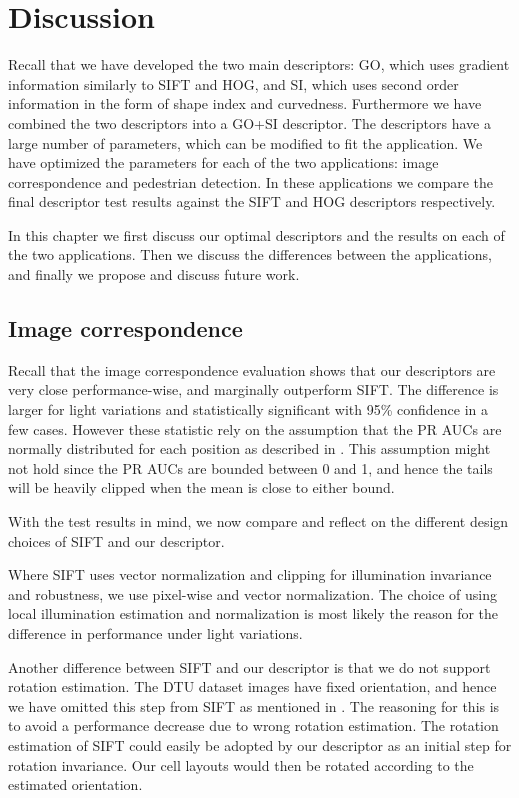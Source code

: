 \documentclass[thesis.tex]{subfiles}
\begin{document}
\chapter{Discussion}

Recall that we have developed the two main descriptors: GO, which uses gradient information similarly to SIFT and HOG, and SI, which uses second order information in the form of shape index and curvedness. Furthermore we have combined the two descriptors into a GO+SI descriptor. The descriptors have a large number of parameters, which can be modified to fit the application. We have optimized the parameters for each of the two applications: image correspondence and pedestrian detection. In these applications we compare the final descriptor test results against the SIFT and HOG descriptors respectively.

In this chapter we first discuss our optimal descriptors and the results on each of the two applications. Then we discuss the differences between the applications, and finally we propose and discuss future work.

\section{Image correspondence}
\label{sec:discussionIc}
Recall that the image correspondence evaluation shows that our descriptors are very close performance-wise, and marginally outperform SIFT. The difference is larger for light variations and statistically significant with 95\% confidence in a few cases. However these statistic rely on the assumption that the PR AUCs are normally distributed for each position as described in . This assumption might not hold since the PR AUCs are bounded between 0 and 1, and hence the tails will be heavily clipped when the mean is close to either bound.

With the test results in mind, we now compare and reflect on the different design choices of SIFT and our descriptor.

Where SIFT uses vector normalization and clipping for illumination invariance and robustness, we use pixel-wise and vector normalization. The choice of using local illumination estimation and normalization is most likely the reason for the difference in performance under light variations.

Another difference between SIFT and our descriptor is that we do not support rotation estimation. The DTU dataset images have fixed orientation, and hence we have omitted this step from SIFT as mentioned in . The reasoning for this is to avoid a performance decrease due to wrong rotation estimation. The rotation estimation of SIFT could easily be adopted by our descriptor as an initial step for rotation invariance. Our cell layouts would then be rotated according to the estimated orientation.
\end{document}
